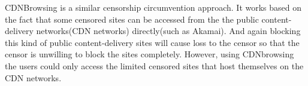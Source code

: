 \documentclass[conference]{IEEEtran}
\begin{document}
CDNBrowsing\cite{CDNbrowsing}\cite{cdnbrowsing} is a similar censorship circumvention approach. It works based on the fact that some censored sites can be accessed from the the public content-delivery networks(CDN networks) directly(such as Akamai). And again blocking this kind of public content-delivery sites will cause loss to the censor so that the censor is unwilling to block the sites completely. However, using CDNbrowsing the users could only access the limited censored sites that host themselves on the CDN networks.

\end{document}

